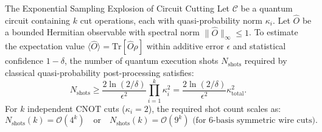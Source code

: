 \begin{theorembox}{The Exponential Sampling Explosion of Circuit Cutting}
Let $\mathcal{C}$ be a quantum circuit containing $k$ cut operations, each with quasi-probability norm $\kappa_i$. Let $\hat{O}$ be a bounded Hermitian observable with spectral norm $\|\hat{O}\|_\infty \le 1$. To estimate the expectation value $\langle \hat{O} \rangle = \text{Tr}[\hat{O} \rho]$ within additive error $\epsilon$ and statistical confidence $1 - \delta$, the number of quantum execution shots $N_{\text{shots}}$ required by classical quasi-probability post-processing satisfies:
\begin{equation}
    N_{\text{shots}} \ge \frac{2 \ln(2/\delta)}{\epsilon^2} \prod_{i=1}^{k} \kappa_i^2 = \frac{2 \ln(2/\delta)}{\epsilon^2} \kappa_{\text{total}}^2.
    \label{eq:sampling_explosion_theorem}
\end{equation}
For $k$ independent CNOT cuts ($\kappa_i = 2$), the required shot count scales as:
\begin{equation}
    N_{\text{shots}}(k) = \mathcal{O}\left( 4^k \right) \quad \text{or} \quad N_{\text{shots}}(k) = \mathcal{O}\left( 9^k \right) \text{ (for 6-basis symmetric wire cuts)}.
\end{equation}
\end{theorembox}

